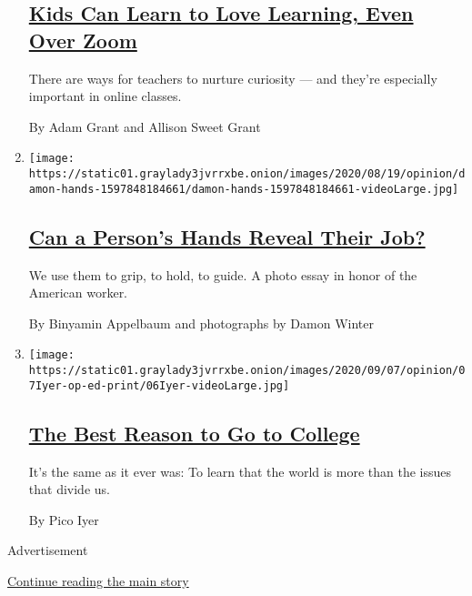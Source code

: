 \begin{enumerate}
  \hypertarget{kids-can-learn-to-love-learning-even-over-zoom}{%
  \subsection{\texorpdfstring{\href{/2020/09/07/opinion/remote-school.html}{Kids
  Can Learn to Love Learning, Even Over
  Zoom}}{Kids Can Learn to Love Learning, Even Over Zoom}}\label{kids-can-learn-to-love-learning-even-over-zoom}}

  There are ways for teachers to nurture curiosity --- and they're
  especially important in online classes.

  By Adam Grant and Allison Sweet Grant
\item
  \texttt{[image: https://static01.graylady3jvrrxbe.onion/images/2020/08/19/opinion/damon-hands-1597848184661/damon-hands-1597848184661-videoLarge.jpg]}

  \hypertarget{can-a-persons-hands-reveal-their-job}{%
  \subsection{\texorpdfstring{\href{/interactive/2020/09/06/opinion/inequality-worker-hand-photos.html}{Can
  a Person's Hands Reveal Their
  Job?}}{Can a Person's Hands Reveal Their Job?}}\label{can-a-persons-hands-reveal-their-job}}

  We use them to grip, to hold, to guide. A photo essay in honor of the
  American worker.

  By Binyamin Appelbaum and photographs by Damon Winter
\item
  \texttt{[image: https://static01.graylady3jvrrxbe.onion/images/2020/09/07/opinion/07Iyer-op-ed-print/06Iyer-videoLarge.jpg]}

  \hypertarget{the-best-reason-to-go-to-college}{%
  \subsection{\texorpdfstring{\href{/2020/09/06/opinion/college-students-learning.html}{The
  Best Reason to Go to
  College}}{The Best Reason to Go to College}}\label{the-best-reason-to-go-to-college}}

  It's the same as it ever was: To learn that the world is more than the
  issues that divide us.

  By Pico Iyer
\end{enumerate}

Advertisement

\protect\hyperlink{after-mid1}{Continue reading the main story}


